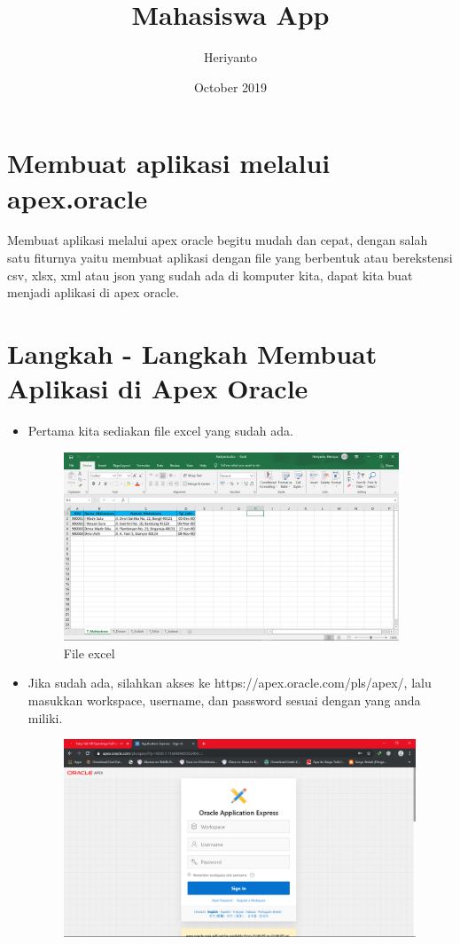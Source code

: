 \documentclass[12pt, times new roman]{article}
\title{Mahasiswa App}
\author{Heriyanto}
\date{October 2019}
\begin{document}
\maketitle
\section{Membuat aplikasi melalui apex.oracle}
Membuat aplikasi melalui apex oracle begitu mudah dan cepat, dengan salah satu fiturnya yaitu membuat aplikasi dengan file yang berbentuk atau berekstensi csv, xlsx, xml atau json yang sudah ada di komputer kita, dapat kita buat menjadi aplikasi di apex oracle.
\section{Langkah - Langkah Membuat Aplikasi di Apex Oracle}
\begin{itemize}
\item Pertama kita sediakan file excel yang sudah ada.
\begin{figure}[htbp]
	\centering
	\includegraphics[width=10cm]{figures/Screenshot_27.png}
	\caption{File excel}
\end{figure}
\item Jika sudah ada, silahkan akses ke https://apex.oracle.com/pls/apex/, lalu masukkan workspace, username, dan password sesuai dengan yang anda miliki.
\begin{figure}[htbp]
	\centering
	\includegraphics[width=10.5cm]{figures/2.png}

\end{figure}
\end{itemize}
\end{document}
